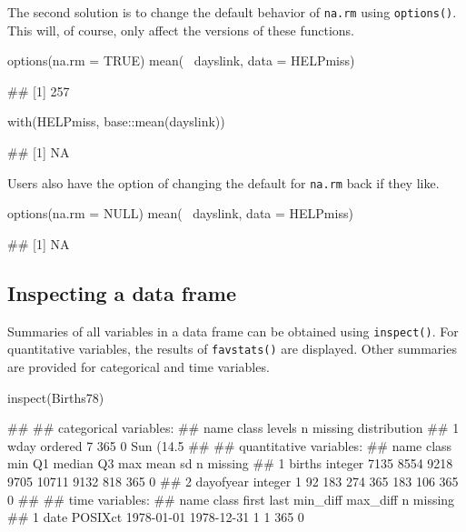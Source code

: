 The second solution is to change the default behavior of \texttt{na.rm}
using \texttt{options()}. This will, of course, only affect the
 versions of these functions.

\begin{Schunk}
\begin{Sinput}
options(na.rm = TRUE)
mean(~ dayslink, data = HELPmiss)
\end{Sinput}
\begin{Soutput}
## [1] 257
\end{Soutput}
\begin{Sinput}
with(HELPmiss, base::mean(dayslink))
\end{Sinput}
\begin{Soutput}
## [1] NA
\end{Soutput}
\end{Schunk}

\noindent
Users also have the option of changing the default for \texttt{na.rm}
back if they like.

\begin{Schunk}
\begin{Sinput}
options(na.rm = NULL)
mean(~ dayslink, data = HELPmiss)
\end{Sinput}
\begin{Soutput}
## [1] NA
\end{Soutput}
\end{Schunk}

\subsection{Inspecting a data frame}\label{inspecting-a-data-frame}

Summaries of all variables in a data frame can be obtained using
\texttt{inspect()}. For quantitative variables, the results of
\texttt{favstats()} are displayed. Other summaries are provided for
categorical and time variables.

\begin{Schunk}
\begin{Sinput}
inspect(Births78)
\end{Sinput}
\begin{Soutput}
## 
## categorical variables:  
##   name   class levels   n missing                                  distribution
## 1 wday ordered      7 365       0 Sun (14.5%
## 
## quantitative variables:  
##        name   class  min   Q1 median   Q3   max mean  sd   n missing
## 1    births integer 7135 8554   9218 9705 10711 9132 818 365       0
## 2 dayofyear integer    1   92    183  274   365  183 106 365       0
## 
## time variables:  
##   name   class      first       last min_diff max_diff   n missing
## 1 date POSIXct 1978-01-01 1978-12-31        1        1 365       0
\end{Soutput}
\end{Schunk}

